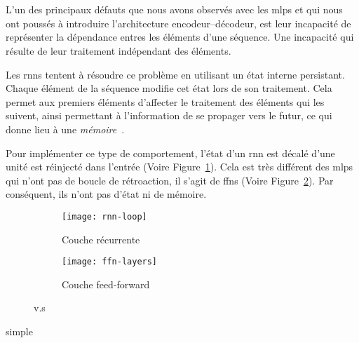 \section{}
\label{sec.rnn}

L'un des principaux défauts que nous avons observés avec les \glspl{mlp} 
et qui nous ont poussés à introduire l'architecture encodeur--décodeur,
est leur incapacité de représenter la dépendance entres les éléments d'une séquence.
Une incapacité qui résulte de leur traitement indépendant des éléments.

Les \glspl{rnn} tentent à résoudre ce problème en utilisant un état interne persistant.
Chaque élément de la séquence modifie cet état lors de son traitement.
Cela permet aux premiers éléments d'affecter le traitement des éléments qui les suivent, 
ainsi permettant à l'information de se propager vers le futur,
ce qui donne lieu à une \emph{mémoire}~\cite{Fathi_2021}.

Pour implémenter ce type de comportement, 
l'état d'un \gls{rnn} est décalé d'une unité est réinjecté dans l'entrée (Voire Figure~\ref{fig.rnn-loop}).
Cela est très différent des \glspl{mlp} qui n'ont pas de boucle de rétroaction,
il s'agit de \glspl{ffn} (Voire Figure~\ref{fig.ffn-layer}).
Par conséquent, ils n'ont pas d'état ni de mémoire.



\begin{figure}[hbt]
    \begin{center}
        \begin{subfigure}{.4\linewidth}
            \texttt{[image: rnn-loop]}
            \caption{Couche récurrente}
            \label{fig.rnn-loop}
        \end{subfigure}
        \begin{subfigure}{.4\linewidth}
            \texttt{[image: ffn-layers]}
            \caption{Couche feed-forward}
            \label{fig.ffn-layer}
        \end{subfigure}
    \end{center}
    \caption{ v.s }
    \label{fig.rnn-vs-ffn}
\end{figure}

{simple}
